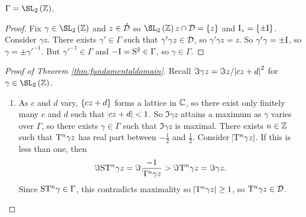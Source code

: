 \begin{corollary}
$ \Gamma = \SL_2\br{\ZZ} $.
\end{corollary}

\begin{proof}
Fix $ \gamma \in \SL_2\br{\ZZ} $ and $ z \in \mathring{\mathcal{D}} $ so $ \SL_2\br{\ZZ}z \cap \DDD = \cbr{z} $ and $ \I_z = \cbr{\pm\I} $. Consider $ \gamma z $. There exists $ \gamma' \in \Gamma $ such that $ \gamma'\gamma z \in \mathcal{D} $, so $ \gamma'\gamma z = z $. So $ \gamma'\gamma = \pm\mathrm{I} $, so $ \gamma = \pm\gamma'^{-1} $. But $ \gamma'^{-1} \in \Gamma $ and $ -\mathrm{I} = \mathrm{S}^2 \in \Gamma $, so $ \gamma \in \Gamma $.
\end{proof}

\pagebreak

\begin{proof}[Proof of Theorem \ref{thm:fundamentaldomain}]
Recall $ \Im \gamma z = \Im z / \abs{cz + d}^2 $ for $ \gamma \in \SL_2\br{\ZZ} $.
\begin{enumerate}
\item As $ c $ and $ d $ vary, $ \cbr{cz + d} $ forms a lattice in $ \mathbb{C} $, so there exist only finitely many $ c $ and $ d $ such that $ \abs{cz + d} < 1 $. So $ \Im \gamma z $ attains a maximum as $ \gamma $ varies over $ \Gamma $, so there exists $ \gamma \in \Gamma $ such that $ \Im \gamma z $ is maximal. There exists $ n \in \mathbb{Z} $ such that $ \mathrm{T}^n\gamma z $ has real part between $ -\tfrac{1}{2} $ and $ \tfrac{1}{2} $. Consider $ \abs{\mathrm{T}^n\gamma z} $. If this is less than one, then
$$ \Im \mathrm{S}\mathrm{T}^n\gamma z = \Im \dfrac{-1}{\mathrm{T}^n\gamma z} > \Im \mathrm{T}^n\gamma z = \Im \gamma z. $$
Since $ \mathrm{S}\mathrm{T}^n\gamma \in \Gamma $, this contradicts maximality so $ \abs{\mathrm{T}^n\gamma z} \ge 1 $, so $ \mathrm{T}^n\gamma z \in \mathcal{D} $.



\end{enumerate}
\end{proof}
